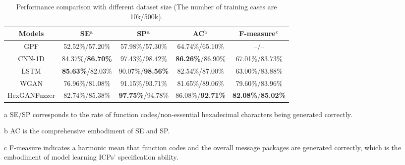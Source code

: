 \begin{table}[t]
	\centering
	\caption{Performance comparison with different dataset size (The number of training cases are 10k/500k).} 
	\label{F-measure}
	\renewcommand{\arraystretch}{1.5}
	\begin{threeparttable}
	\begin{tabular}{c|c|c|c|c}
		\hline
		\textbf{Models}          & \textbf{SE$^{\rm a}$} & \textbf{SP$^{\rm a}$}     & \textbf{AC$^{\rm b}$}     & \textbf{F-measure$^{\rm c}$}     \\ \hline
		GPF               &  52.52\%/57.20\% & 57.98\%/57.30\% & 64.74\%/65.10\%  & --/-- \\ [3pt]
		\hline
		CNN-1D     &  84.37\%/\textbf{86.70\%}    & 97.43\%/98.42\% & \textbf{86.26\%}/86.90\% &  67.01\%/83.73\% \\ [3pt]
		\hline
		LSTM  &    \textbf{85.63\%}/82.03\%  &  90.07\%/\textbf{98.56\%}  &82.54\%/87.00\%  &  63.00\%/83.88\%\\ [3pt]
		\hline
		WGAN &    76.96\%/81.08\%   & 91.15\%/93.71\%& 81.65\%/89.06\% & 79.60\%/83.96\% \\ [3pt]
		\hline
		HexGANFuzzer      &  82.74\%/85.38\%    &  \textbf{97.75\%}/94.78\%& 86.08\%/\textbf{92.71\%} & \textbf{82.08\%}/\textbf{85.02\%} \\ [3pt]
		\hline
	\end{tabular}
	\begin{tablenotes}
		\item[a] SE/SP corresponds to the rate of function codes/non-essential hexadecimal characters being generated correctly.
		\item[b] AC is the comprehensive embodiment of SE and SP.
		\item[c] F-measure indicates a harmonic mean that function codes and the overall message packages are generated correctly, which is the embodiment of model learning ICPs' specification ability.
	\end{tablenotes}
\end{threeparttable}
\end{table}


